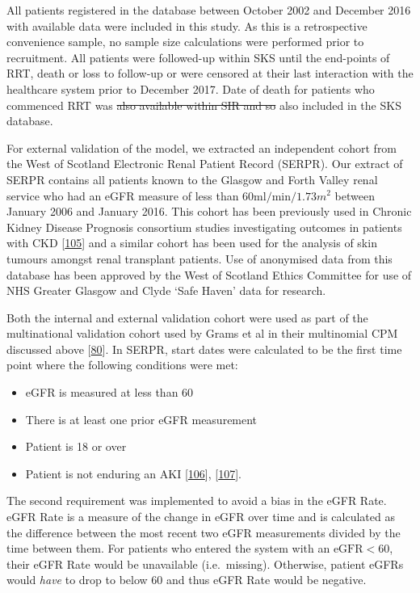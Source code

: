 \documentclass[12pt,PhD,twoside,openright]{muthesis}
\providecommand{\tightlist}{%
  \setlength{\itemsep}{0pt}\setlength{\parskip}{0pt}}
\begin{document}
All patients registered in the database between October 2002 and December 2016 with available data were included in this study. As this is a retrospective convenience sample, no sample size calculations were performed prior to recruitment. All patients were followed-up within SKS until the end-points of RRT, death or loss to follow-up or were censored at their last interaction with the healthcare system prior to December 2017. Date of death for patients who commenced RRT was \sout{also available within SIR and so} also included in the SKS database.

For external validation of the model, we extracted an independent cohort from the West of Scotland Electronic Renal Patient Record (SERPR). Our extract of SERPR contains all patients known to the Glasgow and Forth Valley renal service who had an eGFR measure of less than \(60\textrm{ml}/\textrm{min}/1.73m^2\) between January 2006 and January 2016. This cohort has been previously used in Chronic Kidney Disease Prognosis consortium studies investigating outcomes in patients with CKD {[}\protect\hyperlink{ref-matsushita_cohort_2013}{105}{]} and a similar cohort has been used for the analysis of skin tumours amongst renal transplant patients. Use of anonymised data from this database has been approved by the West of Scotland Ethics Committee for use of NHS Greater Glasgow and Clyde `Safe Haven' data for research.

Both the internal and external validation cohort were used as part of the multinational validation cohort used by Grams et al in their multinomial CPM discussed above {[}\protect\hyperlink{ref-grams_predicting_2018}{80}{]}. In SERPR, start dates were calculated to be the first time point where the following conditions were met:
\begin{itemize}
\tightlist
\item
  eGFR is measured at less than 60
\item
  There is at least one prior eGFR measurement
\item
  Patient is 18 or over
\item
  Patient is not enduring an AKI {[}\protect\hyperlink{ref-forni_renal_2017-1}{106}{]}, {[}\protect\hyperlink{ref-noauthor_kdigo_2012}{107}{]}.
\end{itemize}
The second requirement was implemented to avoid a bias in the eGFR Rate. eGFR Rate is a measure of the change in eGFR over time and is calculated as the difference between the most recent two eGFR measurements divided by the time between them. For patients who entered the system with an \(\textrm{eGFR} < 60\), their eGFR Rate would be unavailable (i.e.~missing). Otherwise, patient eGFRs would \emph{have} to drop to below 60 and thus eGFR Rate would be negative.
\end{document}

